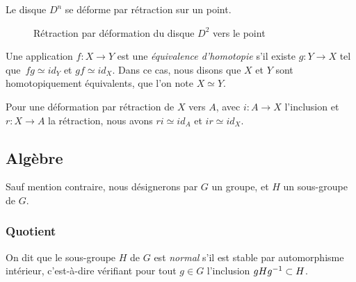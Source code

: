 \begin{exemple}
Le disque $D^{n}$ se déforme par rétraction sur un point.

\begin{figure}[H]
    \centering
    \caption{Rétraction par déformation du disque $D^2$ vers le point}
    \label{fig:def-retract-disk}
\end{figure}
\end{exemple}

\begin{definition}\label{def:homotopy-equiv}
Une application $f:X\to Y$ est une \emph{équivalence d'homotopie} s'il existe $g:Y\to X$ tel que~$fg\simeq id_Y$ et $gf\simeq id_X$. Dans ce cas, nous disons que $X$ et $Y$ sont homotopiquement équivalents, que l'on note $X\simeq Y$.
\end{definition}

\begin{exemple}
Pour une déformation par rétraction de $X$ vers $A$, avec $i:A\to X$ l'inclusion et $r:X\to A$ la rétraction, nous avons $ri\simeq id_A$ et $ir\simeq id_X$.
\end{exemple}

\subsection{Algèbre}

Sauf mention contraire, nous désignerons par $G$ un groupe, et $H$ un sous-groupe de $G$.

\subsubsection{Quotient}

\begin{definition}
On dit que le sous-groupe $H$ de $G$ est \emph{normal} s'il est stable par automorphisme intérieur, c'est-à-dire vérifiant pour tout $g\in G$ l'inclusion $gHg^{-1}\subset H$.
\end{definition}

